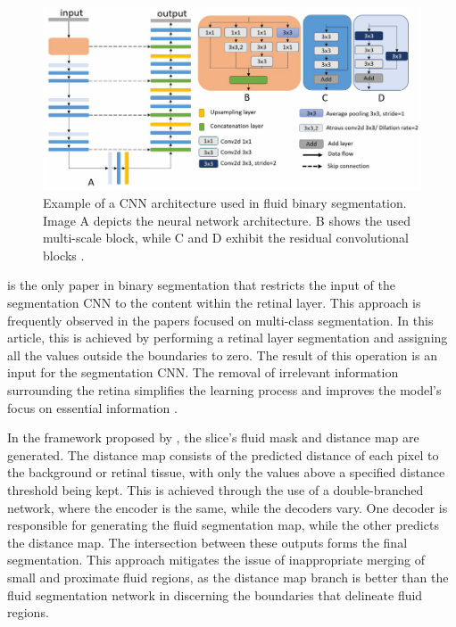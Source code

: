 \begin{figure}[!ht]
	\centering
	\includegraphics[width=1\linewidth]{figures/BinarySegmentationExample.png}
	\caption{Example of a CNN architecture used in fluid binary segmentation. Image A depicts the neural network architecture. B shows the used multi-scale block, while C and D exhibit the residual convolutional blocks \parencite{Guo2020}.}
	\label{fig:BinarySegmentationExample}
\end{figure}
\par
\textcite{Pawan2021} is the only paper in binary segmentation that restricts the input of the segmentation CNN to the content within the retinal layer. This approach is frequently observed in the papers focused on multi-class segmentation. In this article, this is achieved by performing a retinal layer segmentation and assigning all the values outside the boundaries to zero. The result of this operation is an input for the segmentation CNN. The removal of irrelevant information surrounding the retina simplifies the learning process and improves the model's focus on essential information \parencite{Mantel2021}.
\par
In the framework proposed by \textcite{Liu2021}, the  slice's fluid mask and distance map are generated. The distance map consists of the predicted distance of each pixel to the background or retinal tissue, with only the values above a specified distance threshold being kept. This is achieved through the use of a double-branched network, where the encoder is the same, while the decoders vary. One decoder is responsible for generating the fluid segmentation map, while the other predicts the distance map. The intersection between these outputs forms the final segmentation. This approach mitigates the issue of inappropriate merging of small and proximate fluid regions, as the distance map branch is better than the fluid segmentation network in discerning the boundaries that delineate fluid regions.
